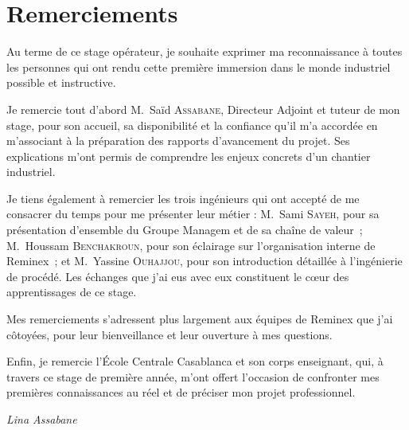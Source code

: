 \chapter*{Remerciements}

Au terme de ce stage opérateur, je souhaite exprimer ma reconnaissance à toutes les personnes qui ont rendu cette première immersion dans le monde industriel possible et instructive.

Je remercie tout d'abord M.~Saïd \textsc{Assabane}, Directeur Adjoint et tuteur de mon stage, pour son accueil, sa disponibilité et la confiance qu'il m'a accordée en m'associant à la préparation des rapports d'avancement du projet. Ses explications m'ont permis de comprendre les enjeux concrets d'un chantier industriel.

Je tiens également à remercier les trois ingénieurs qui ont accepté de me consacrer du temps pour me présenter leur métier : M.~Sami \textsc{Sayeh}, pour sa présentation d'ensemble du Groupe Managem et de sa chaîne de valeur~; M.~Houssam \textsc{Benchakroun}, pour son éclairage sur l'organisation interne de Reminex~; et M.~Yassine \textsc{Ouhajjou}, pour son introduction détaillée à l'ingénierie de procédé. Les échanges que j'ai eus avec eux constituent le cœur des apprentissages de ce stage.

Mes remerciements s'adressent plus largement aux équipes de Reminex que j'ai côtoyées, pour leur bienveillance et leur ouverture à mes questions.

Enfin, je remercie l'École Centrale Casablanca et son corps enseignant, qui, à travers ce stage de première année, m'ont offert l'occasion de confronter mes premières connaissances au réel et de préciser mon projet professionnel.

\vspace{1cm}
{\raggedleft\itshape Lina Assabane\par}
